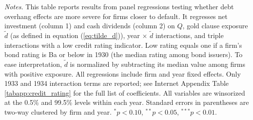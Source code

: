 \begin{table}[p]
    \vspace*{3mm} \justifying \noindent
    \scriptsize{\textit{Notes.} This table reports results from panel regressions testing whether debt overhang effects are more severe for firms closer to default. It regresses net investment (column 1) and cash dividends (column 2) on $Q$, gold clause exposure $\tilde{d}$ (as defined in equation (\ref{eq:tilde_d})), year $\times$ $\tilde{d}$ interactions, and triple interactions with a low credit rating indicator. Low rating equals one if a firm's bond rating is Ba or below in 1930 (the median rating among bond issuers). To ease interpretation, $\tilde{d}$ is normalized by subtracting its median value among firms with positive exposure. All regressions include firm and year fixed effects. Only 1933 and 1934 interaction terms are reported; see Internet Appendix Table \ref{tabapp:credit_rating} for the full list of coefficients. All variables are winsorized at the 0.5\% and 99.5\% levels within each year. Standard errors in parentheses are two-way clustered by firm and year. $^{*}p<0.10$, $^{**}p<0.05$, $^{***}p<0.01$.}
\end{table}